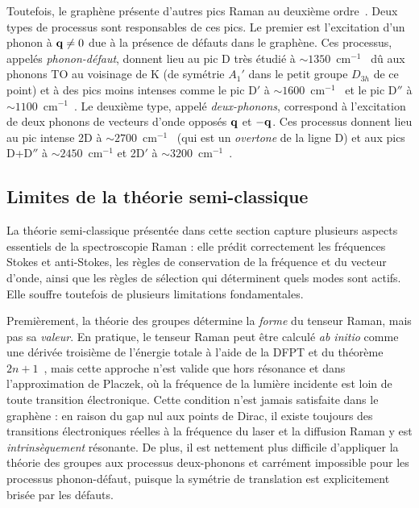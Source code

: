 Toutefois, le graphène présente d'autres pics Raman au deuxième ordre~\cite{mohiuddinUniaxialStrainGraphene2009,dresselhausRamanSpectroscopyIsolated2002}. Deux types de processus sont responsables de ces pics. Le premier est l'excitation d'un phonon à $\mathbf{q}\neq 0$ due à la présence de défauts dans le graphène. Ces processus, appelés \textit{phonon-défaut}, donnent lieu au pic D très étudié à $\sim 1350$~cm$^{-1}$~\cite{tuinstraRamanSpectrumGraphite1970,ferrariInterpretationRamanSpectra2000,ferrariResonantRamanSpectroscopy2001} dû aux phonons TO au voisinage de K (de symétrie $A_1'$ dans le petit groupe $D_{3h}$ de ce point) et à des pics moins intenses comme le pic D$'$ à $\sim 1600$~cm$^{-1}$~\cite{nemanichFirstSecondorderRaman1979} et le pic D$''$ à $\sim 1100$~cm$^{-1}$~\cite{luccheseQuantifyingIoninducedDefects2010,martinsferreiraEvolutionRamanSpectra2010}. Le deuxième type, appelé \textit{deux-phonons}, correspond à l'excitation de deux phonons de vecteurs d'onde opposés $\mathbf{q}$
et $-\mathbf{q}$. Ces processus donnent lieu au pic intense 2D à $\sim 2700$~cm$^{-1}$~\cite{ferrariRamanSpectrumGraphene2006} (qui est un \textit{overtone} de la ligne D) et aux pics D+D$''$ à $\sim 2450$~cm$^{-1}$ et 2D$'$ à $\sim 3200$~cm$^{-1}$~\cite{berciaudProbingIntrinsicProperties2009}.

\subsection{Limites de la théorie semi-classique}

La théorie semi-classique présentée dans cette section capture plusieurs aspects essentiels de la spectroscopie Raman : elle prédit correctement les fréquences Stokes et anti-Stokes, les règles de conservation de la fréquence et du vecteur d'onde, ainsi que les règles de sélection qui déterminent quels modes sont actifs. Elle souffre toutefois de plusieurs limitations fondamentales.

Premièrement, la théorie des groupes détermine la \textit{forme} du tenseur Raman, mais pas sa \textit{valeur}. En pratique, le tenseur Raman peut être calculé \textit{ab initio} comme une dérivée troisième de l'énergie totale à l'aide de la DFPT et du théorème $2n+1$~\cite{lazzeriFirstPrinciplesCalculationVibrational2003}, mais cette approche n'est valide que hors résonance et dans l'approximation de Placzek, où la fréquence de la lumière incidente est loin de toute transition électronique. Cette condition n'est jamais satisfaite dans le graphène : en raison du gap nul aux points de Dirac, il existe toujours des transitions électroniques réelles à la fréquence du laser et la diffusion Raman y est \textit{intrinsèquement} résonante. De plus, il est nettement plus difficile d'appliquer la théorie des groupes aux processus deux-phonons et carrément impossible pour les processus phonon-défaut, puisque la symétrie de translation est explicitement brisée par les défauts.

